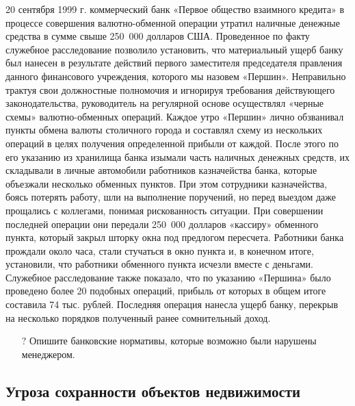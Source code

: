 \documentclass[a4paper,12pt,fleqn]{article} %
\begin{document}
\begin{tcolorbox}[colback=blue!55!red!5!,colframe=blue!55!red,enforce breakable,%
	pad at break=1mm, title=Кейс 31. Изобретательный менеджер]

	20 сентября 1999 г. коммерческий банк «Первое общество взаимного кредита» в процессе совершения валютно-обменной операции утратил наличные денежные средства в сумме свыше 250 000 долларов США. Проведенное по факту служебное расследование позволило установить, что материальный ущерб банку был нанесен в результате действий первого заместителя председателя правления данного финансового учреждения, которого мы назовем «Першин». Неправильно трактуя свои должностные полномочия и игнорируя требования действующего законодательства, руководитель на регулярной основе осуществлял «черные схемы» валютно-обменных операций. Каждое утро «Першин» лично обзванивал пункты обмена валюты столичного города и составлял схему из нескольких операций в целях получения определенной прибыли от каждой. После этого по его указанию из хранилища банка изымали часть наличных денежных средств, их складывали в личные автомобили работников казначейства банка, которые объезжали несколько обменных пунктов. При этом сотрудники казначейства, боясь потерять работу, шли на выполнение поручений, но перед выездом даже прощались с коллегами, понимая рискованность ситуации. При совершении последней операции они передали 250 000 долларов «кассиру» обменного пункта, который закрыл шторку окна под предлогом пересчета. Работники банка прождали около часа, стали стучаться в окно пункта и, в конечном итоге, установили, что работники обменного пункта исчезли вместе с деньгами. Служебное расследование также показало, что по указанию «Першина» было проведено более 20 подобных операций, прибыль от которых в общем итоге составила 74 тыс. рублей. Последняя операция нанесла ущерб банку, перекрыв на несколько порядков полученный ранее сомнительный доход.	
	
\begin{itemize}
	\item[{\color{blue!55!red}\Huge {  $ ? $}} \quad]   Опишите банковские нормативы, которые возможно были нарушены менеджером.
\end{itemize}	
	
\end{tcolorbox}	
	
	
\subsection{Угроза сохранности объектов недвижимости}	
	
\end{document}
